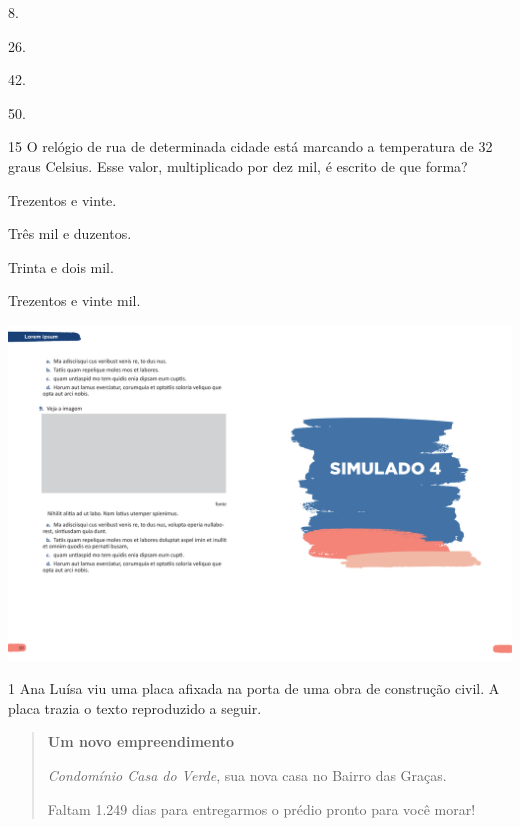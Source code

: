 \begin{escolha}
\item
  8.
\item
  26.
\item
  42.
\item
  50.
\end{escolha}


\num{15} O relógio de rua de determinada cidade está marcando a temperatura
de 32 graus Celsius. Esse valor, multiplicado por dez mil, é escrito de que forma?

\begin{escolha}
\item Trezentos e vinte.
\item Três mil e duzentos.
\item Trinta e dois mil.
\item Trezentos e vinte mil.
\end{escolha}

\vspace*{-3.4cm}
\hspace*{-3.7cm}\includegraphics[scale=1]{../watermarks/4simulado5ano.pdf}

\num{1} Ana Luísa viu uma placa afixada na porta de uma obra de construção civil. A placa trazia o texto reproduzido a seguir.

\begin{quote}
\textbf{Um novo empreendimento}

\textit{Condomínio Casa do Verde}, sua nova casa no Bairro das Graças.

Faltam 1.249 dias para entregarmos o prédio pronto para você morar!
\end{quote}

